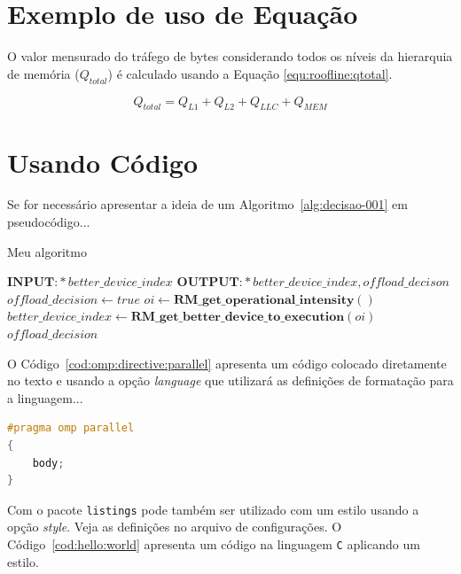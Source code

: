 \section{Exemplo de uso de Equação}
\label{cap:conceitos:sec:usando:equacoes}

O valor mensurado do tráfego de bytes considerando todos os níveis da hierarquia de memória ($Q_{total}$) é calculado usando a Equação \ref{equ:roofline:qtotal}.

\begin{equation}\label{equ:roofline:qtotal}
Q_{total} = Q_{L1} + Q_{L2} + Q_{LLC} + Q_{MEM}
\end{equation}

\section{Usando Código}
\label{cap:conceitos:sec:usando:codigo}

Se for necessário apresentar a ideia de um Algoritmo~\ref{alg:decisao-001} em pseudocódigo...

\begin{algorithm}[H]
	\caption{Meu algoritmo}
	\label{alg:decisao-001}
	\begin{algorithmic}[1]
		\STATE $\textbf{INPUT:}*better\_device\_index$
		\STATE $\textbf{OUTPUT:} *better\_device\_index, offload\_decison$
		\STATE $offload\_decision \leftarrow true$
		\STATE $oi \leftarrow \textbf{RM\_get\_operational\_intensity}()$
		\STATE $better\_device\_index \leftarrow \textbf{RM\_get\_better\_device\_to\_execution}(oi)$ 
		\ELSE
		\ENDIF
		\RETURN $offload\_decision$
	\end{algorithmic}
\end{algorithm}

O Código~\ref{cod:omp:directive:parallel} apresenta um código colocado diretamente no texto e usando a opção \textit{language} que utilizará as definições de formatação para a linguagem...

\begin{lstlisting}[language=C, basicstyle=\small, label=cod:omp:directive:parallel, caption={Parallel directive format}]
#pragma omp parallel
{
	body;
}
\end{lstlisting}

Com o pacote \texttt{listings} pode também ser utilizado com um estilo usando a opção \textit{style}. Veja as definições no arquivo de configurações. O Código~\ref{cod:hello:world} apresenta um código na linguagem \texttt{C} aplicando um estilo.

